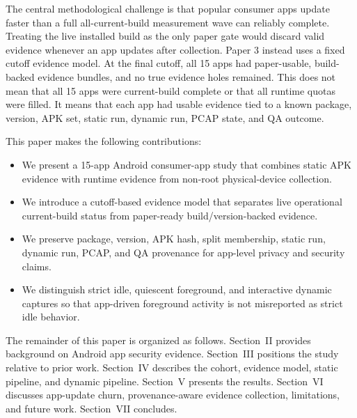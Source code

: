 The central methodological challenge is that popular consumer apps update faster than a full all-current-build measurement wave can reliably complete. Treating the live installed build as the only paper gate would discard valid evidence whenever an app updates after collection. Paper 3 instead uses a fixed cutoff evidence model. At the final cutoff, all 15 apps had paper-usable, build-backed evidence bundles, and no true evidence holes remained. This does not mean that all 15 apps were current-build complete or that all runtime quotas were filled. It means that each app had usable evidence tied to a known package, version, APK set, static run, dynamic run, PCAP state, and QA outcome.

This paper makes the following contributions:
\begin{itemize}
    \item We present a 15-app Android consumer-app study that combines static APK evidence with runtime evidence from non-root physical-device collection.
    \item We introduce a cutoff-based evidence model that separates live operational current-build status from paper-ready build/version-backed evidence.
    \item We preserve package, version, APK hash, split membership, static run, dynamic run, PCAP, and QA provenance for app-level privacy and security claims.
    \item We distinguish strict idle, quiescent foreground, and interactive dynamic captures so that app-driven foreground activity is not misreported as strict idle behavior.
\end{itemize}

The remainder of this paper is organized as follows. Section~II provides background on Android app security evidence. Section~III positions the study relative to prior work. Section~IV describes the cohort, evidence model, static pipeline, and dynamic pipeline. Section~V presents the results. Section~VI discusses app-update churn, provenance-aware evidence collection, limitations, and future work. Section~VII concludes.
